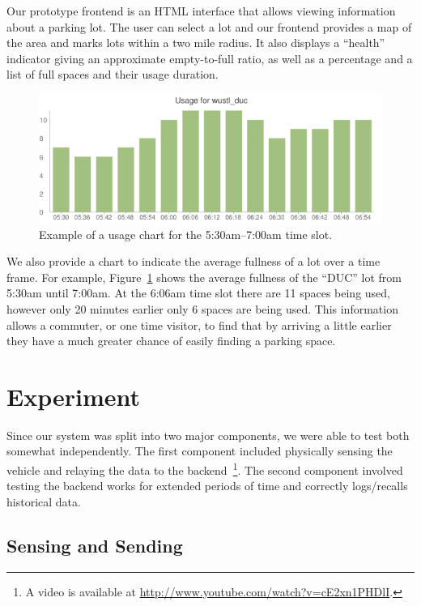 \documentclass{acm_proc}
\begin{document}
Our prototype frontend is an HTML interface that allows viewing information
about a parking lot.
The user can select a lot and our frontend provides a map of the area and
marks lots within a two mile radius.
It also displays a ``health'' indicator giving an approximate empty-to-full
ratio, as well as a percentage and a list of full spaces and their usage
duration.

\begin{figure}
    \begin{center}
		\includegraphics[width=\columnwidth]{figures/fullness-chart}
	\end{center}
	\caption{Example of a usage chart for the 5:30am--7:00am time slot.}
	\label{fig:fullness-chart}
\end{figure}

We also provide a chart to indicate the average fullness of a lot over a
time frame.
For example, Figure~\ref{fig:fullness-chart} shows the average fullness of
the ``DUC'' lot from 5:30am until 7:00am.
At the 6:06am time slot there are 11 spaces being used, however only 20
minutes earlier only 6 spaces are being used.
This information allows a commuter, or one time visitor, to find that by
arriving a little earlier they have a much greater chance of easily finding
a parking space.

\section{Experiment}\label{sec:experiment}

Since our system was split into two major components, we were able to test
both somewhat independently. 
The first component included physically sensing the vehicle and relaying
the data to the backend~\footnote{A video is available at
\url{http://www.youtube.com/watch?v=cE2xn1PHDlI}.}.
The second component involved testing the backend works for extended
periods of time and correctly logs/recalls historical data.

\subsection{Sensing and Sending}
\end{document}
